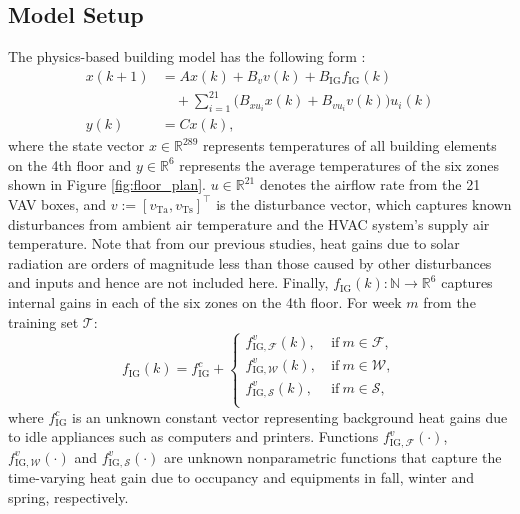 \subsection{Model Setup}\label{sec:physics_model}

The physics-based building model has the following form \cite{Qie}:
\begin{subequations}\label{eq:physics_model}
\begin{align}
x(k+1) &= Ax(k)+B_v v(k) + B_\text{IG} f_\text{IG}(k) \label{eq:physics_model1} \\ \nonumber
	& \quad + \textstyle \sum_{i=1}^{21} \big( B_{xu_i} x(k) + B_{vu_i} v(k) \big) u_i(k) \label{eq:physics_model_2} \\
y(k) &= C x(k),
\end{align}
\end{subequations}
where the state vector $x \in \mathbb{R}^{289}$ represents temperatures of all building elements on the 4th floor and $y \in \mathbb{R}^6$ represents the average temperatures of the six zones shown in Figure \ref{fig:floor_plan}. $u \in \mathbb{R}^{21}$ denotes the airflow rate from the 21 VAV boxes, and $v := [v_\text{Ta}, v_\text{Ts}]^\top$ is the disturbance vector, which captures known disturbances from ambient air temperature and the HVAC system's supply air temperature. 
Note that from our previous studies, heat gains due to solar radiation are orders of magnitude less than those caused by other disturbances and inputs and hence are not included here. 
Finally, $f_\text{IG}(k) : \mathbb{N} \rightarrow \mathbb{R}^6$ captures internal gains in each of the six zones on the 4th floor. For week $m$ from the training set $\mathcal{T}$:
\begin{equation}\label{eq:fig}
f_\text{IG}(k) = f_\text{IG}^c + \begin{cases}
	f_{\text{IG},\mathcal{F}}^v(k), & ~\text{if} ~ m \in \mathcal{F}, \\
	f_{\text{IG},\mathcal{W}}^v(k), & ~\text{if} ~ m \in \mathcal{W}, \\
	f_{\text{IG},\mathcal{S}}^v(k), & ~\text{if} ~ m \in \mathcal{S}, \\
	\end{cases}
\end{equation}
where $f_\text{IG}^c$ is an unknown constant vector representing background heat gains due to idle appliances such as computers and printers. Functions $f_{\text{IG},\mathcal{F}}^v(\cdot)$, $f_{\text{IG},\mathcal{W}}^v(\cdot)$ and $f_{\text{IG},\mathcal{S}}^v(\cdot)$ are unknown nonparametric functions that capture the time-varying heat gain due to occupancy and equipments in fall, winter and spring, respectively.
